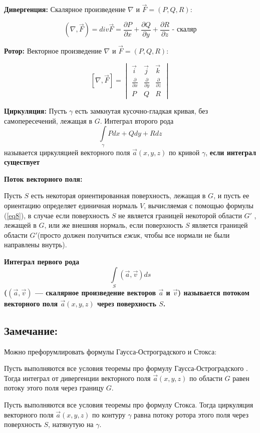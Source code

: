 \documentclass[12pt, english]{article}
\begin{document}
\textbf{Дивергенция:}
	Скалярное произведение $\nabla $ и  $\vec{F}= (P , Q , R)$:
	
	$$(\nabla , \vec{F}) = div \vec{F} = \frac{\partial P}{\partial x} + \frac{\partial Q}{\partial y} + \frac{\partial R}{\partial z} \text{ - скаляр}$$ 

\textbf{Ротор:}
	Векторное произведение $\nabla $ и  $\vec{F}= (P , Q , R)$:

$$
[\nabla ,\vec{F}] = 
\begin{vmatrix}
\vec{i} & \vec{j} & \vec{k} \\
\frac{\partial}{\partial x} & \frac{\partial}{\partial y}& \frac{\partial}{\partial z} \\
P & Q & R
\end{vmatrix}
$$

\textbf{Циркуляция:}
	Пусть $\gamma$ есть замкнутая кусочно-гладкая кривая, без самопересечений,
лежащая в $G$. Интеграл второго рода 
	$$\int\limits_{\gamma} P dx + Q dy + R dz$$
называется циркуляцией векторного поля $\vec{a}(x, y, z)$ по кривой $\gamma$, \textbf{если интеграл существует}

\textbf{Поток векторного поля:}

	Пусть $S$ есть некоторая ориентированная поверхность, лежащая в $G$,
и пусть ее ориентацию определяет единичная нормаль 
$V$, вычисляемая с помощью формулы (\ref{eq8}), в случае если поверхность $S$ не является границей некоторой области $G'$
, лежащей в $G$, или же внешняя нормаль, если
поверхность $S$ является границей области $G'$(просто должен получиться \textit{ежик}, чтобы все нормали не были направлены внутрь).
 
\textbf{Интеграл первого рода}
	$$\int\limits_{S} (\vec{a} , \vec{v})ds$$
\textbf{($(\vec{a} , \vec{v})$ — скалярное произведение векторов $\vec{a}$ и $\vec{v}$) называется потоком векторного поля $\vec{a}(x, y, z)$ через поверхность $S$.}

\subsection{Замечание:}
	Можно префорумлировать формулы Гаусса-Остроградского и Стокса:
	
	Пусть выполняются все условия теоремы про формулу Гаусса-Остроградского . Тогда интеграл от дивергенции векторного поля $\vec{a}(x, y, z)$ по области $G$ равен потоку этого поля через границу $G$.


	Пусть выполняются все условия теоремы про формулу Стокса. Тогда циркуляция векторного поля $\vec{a}(x, y, z)$ по контуру $\gamma$ равна потоку ротора этого поля через поверхность $S$, натянутую на $\gamma$.
	
\end{document}
